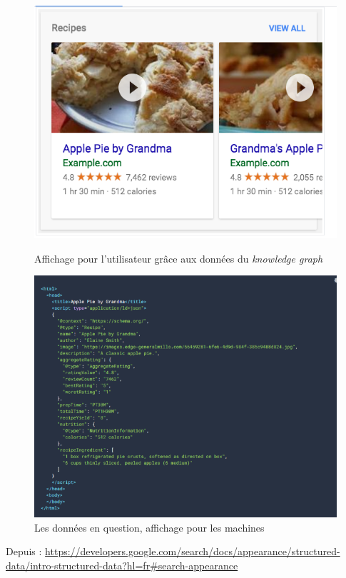 \begin{figure}[h!]
	\centering
	\begin{minipage}[b]{0.45\textwidth}
		\centering
		\includegraphics[width=\textwidth]{images/image4.png}
		\caption{Affichage pour l'utilisateur grâce aux données du \textit{knowledge graph}}
		\label{fig:image4}
	\end{minipage}
	\hspace{0.05\textwidth} %
	\begin{minipage}[b]{0.45\textwidth}
		\centering
		\includegraphics[width=\textwidth]{images/image5.png}
		\caption{Les données en question, affichage pour les machines}
		\label{fig:image5}
	\end{minipage}
\end{figure}
\begin{center}

Depuis :  \url{https://developers.google.com/search/docs/appearance/structured-data/intro-structured-data?hl=fr#search-appearance}

\end{center}

